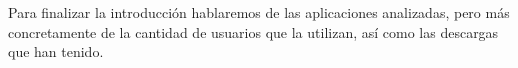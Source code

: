 \documentclass[a4paper, 11pt]{article}
\begin{document}

      Para finalizar la introducción hablaremos de las aplicaciones analizadas,
      pero más concretamente de la cantidad de usuarios que la utilizan, así como
      las descargas que han tenido.\\
\end{document}
